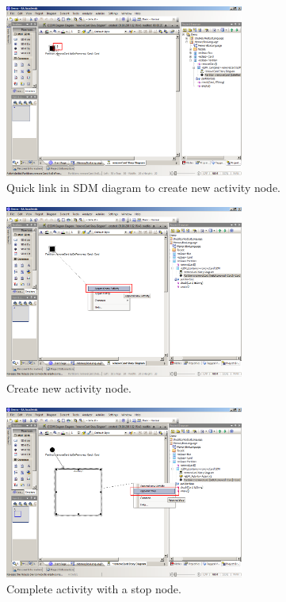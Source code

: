 \begin{figure}[htp]
\begin{center}
  \includegraphics[width=0.7\textwidth]{pics/sdmBilder/removeCard/sdm03RAW}
  \caption{Quick link in SDM diagram to create new activity node.}  
  \label{fig:sdm_quicklink}
\end{center}
\end{figure}

\begin{figure}[htp]
\begin{center}
  \includegraphics[width=0.7\textwidth]{pics/sdmBilder/removeCard/sdm04RAW}
  \caption{Create new activity node.}  
  \label{fig:sdm_new_activity_node}
\end{center}
\end{figure}

\begin{figure}[htp]
\begin{center}
  \includegraphics[width=0.7\textwidth]{pics/sdmBilder/removeCard/sdm05RAW}
  \caption{Complete activity with a stop node.}  
  \label{fig:sdm_stop_node}
\end{center}
\end{figure}

